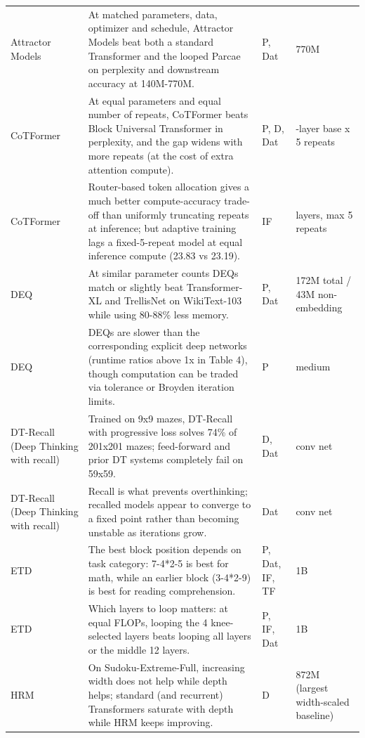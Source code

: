 \begin{longtable}{@{}>{\raggedright\arraybackslash}p{2.7cm}>{\raggedright\arraybackslash}p{7.9cm}>{\raggedright\arraybackslash}p{1.3cm}>{\raggedright\arraybackslash}p{2.5cm}@{}}
Attractor Models~\citep{ax2605.12466} & At matched parameters, data, optimizer and schedule, Attractor Models beat both a standard Transformer and the looped Parcae on perplexity and downstream accuracy at 140M-770M. & P, Dat & 770M \\
CoTFormer~\citep{ax2310.10845} & At equal parameters and equal number of repeats, CoTFormer beats Block Universal Transformer in perplexity, and the gap widens with more repeats (at the cost of extra attention compute). & P, D, Dat & 24-layer base x 5 repeats \\
CoTFormer~\citep{ax2310.10845} & Router-based token allocation gives a much better compute-accuracy trade-off than uniformly truncating repeats at inference; but adaptive training lags a fixed-5-repeat model at equal inference compute (23.83 vs 23.19). & IF & 24 layers, max 5 repeats \\
DEQ~\citep{ax1909.01377} & At similar parameter counts DEQs match or slightly beat Transformer-XL and TrellisNet on WikiText-103 while using 80-88\% less memory. & P, Dat & 172M total / 43M non-embedding \\
DEQ~\citep{ax1909.01377} & DEQs are slower than the corresponding explicit deep networks (runtime ratios above 1x in Table 4), though computation can be traded via tolerance or Broyden iteration limits. & P & medium \\
DT-Recall (Deep Thinking with recall)~\citep{ax2202.05826} & Trained on 9x9 mazes, DT-Recall with progressive loss solves 74\% of 201x201 mazes; feed-forward and prior DT systems completely fail on 59x59. & D, Dat & conv net \\
DT-Recall (Deep Thinking with recall)~\citep{ax2202.05826} & Recall is what prevents overthinking; recalled models appear to converge to a fixed point rather than becoming unstable as iterations grow. & Dat & conv net \\
ETD~\citep{ax2510.07358} & The best block position depends on task category: 7-4*2-5 is best for math, while an earlier block (3-4*2-9) is best for reading comprehension. & P, Dat, IF, TF & 1B \\
ETD~\citep{ax2510.07358} & Which layers to loop matters: at equal FLOPs, looping the 4 knee-selected layers beats looping all layers or the middle 12 layers. & P, IF, Dat & 1B \\
HRM~\citep{ax2506.21734} & On Sudoku-Extreme-Full, increasing width does not help while depth helps; standard (and recurrent) Transformers saturate with depth while HRM keeps improving. & D & 872M (largest width-scaled baseline) \\

\end{longtable}
